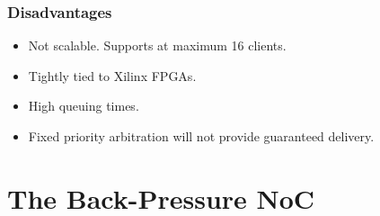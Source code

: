 \documentclass{beamer}
\begin{document}
	    \begin{frame}\frametitle{Disadvantages}
	    \pause
	    \begin{itemize}
	        \item Not scalable. Supports at maximum 16 clients.
	        \pause
	        \item Tightly tied to Xilinx FPGAs.
	        \pause
	        \item High queuing times.
	        \pause
	        \item Fixed priority arbitration will not provide guaranteed delivery.
        \end{itemize}
	    \end{frame}	
	
	\section{The Back-Pressure NoC}
        
\end{document}
